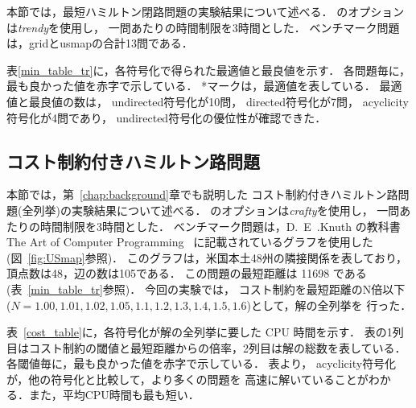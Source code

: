 
本節では，最短ハミルトン閉路問題の実験結果について述べる．
{\clingo}のオプションは\textit{trendy}を使用し，
一問あたりの時間制限を3時間とした．
ベンチマーク問題は，\textsf{grid}と\textsf{usmap}の合計13問である．

表\ref{min_table_tr}に，各符号化で得られた最適値と最良値を示す．
各問題毎に，最も良かった値を赤字で示している．
*マークは，最適値を表している．
最適値と最良値の数は，
\textsf{undirected}符号化が10問，
\textsf{directed}符号化が7問，
\textsf{acyclicity}符号化が4問であり，
\textsf{undirected}符号化の優位性が確認できた．

\subsection{コスト制約付きハミルトン路問題}


本節では，第~\ref{chap:background}章でも説明した
コスト制約付きハミルトン路問題(全列挙)の実験結果について述べる．
{\clingo}のオプションは\textit{crafty}を使用し，
一問あたりの時間制限を3時間とした．
ベンチマーク問題は，D.~E~.Knuth の教科書
The Art of Computer Programming~\cite{Knuth:TAOCP:SAT}
に記載されているグラフを使用した(図~\ref{fig:USmap}参照)．
このグラフは，米国本土48州の隣接関係を表しており，
頂点数は48，辺の数は105である．
この問題の最短距離は 11698 である(表~\ref{min_table_tr}参照)．
今回の実験では，
コスト制約を最短距離のN倍以下
($N=1.00,1.01,1.02,1.05,1.1,1.2,1.3,1.4,1.5,1.6$)として，解の全列挙を
行った．

表~\ref{cost_table}に，各符号化が解の全列挙に要した CPU 時間を示す．
表の1列目はコスト制約の閾値と最短距離からの倍率，2列目は解の総数を表している．
各閾値毎に，最も良かった値を赤字で示している．
表より，
\textsf{acyclicity}符号化が，他の符号化と比較して，より多くの問題を
高速に解いていることがわかる．また，平均CPU時間も最も短い．


